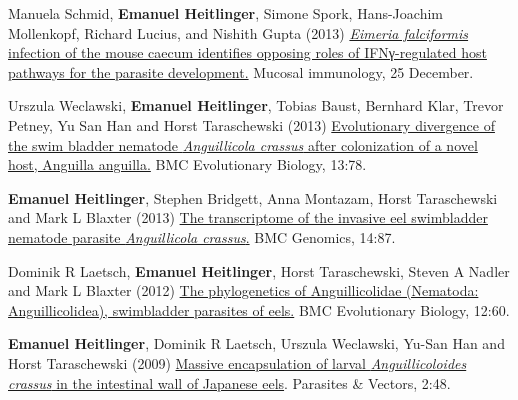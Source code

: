 \documentclass[10pt,a4paper]{article}
\renewenvironment{itemize}{
  \begin{list}{}{
    \setlength{\leftmargin}{2.5em}
    \setlength{\itemsep}{0.25em}
    \setlength{\parskip}{0pt}
    \setlength{\parsep}{0.25em}
  }
}{
  \end{list}
}
\begin{document}
\begin{itemize}



\item Manuela Schmid, \textbf{Emanuel Heitlinger}, Simone Spork, Hans-Joachim
  Mollenkopf, Richard Lucius, and Nishith Gupta (2013)
  \href{http://www.nature.com/mi/journal/vaop/ncurrent/full/mi2013115a.html}
  {\textit{Eimeria falciformis} infection of the mouse caecum identifies
    opposing roles of IFNγ-regulated host pathways for the parasite
    development.} Mucosal immunology, 25 December.

\item Urszula Weclawski, \textbf{Emanuel Heitlinger}, Tobias Baust,
  Bernhard Klar, Trevor Petney, Yu San Han and Horst Taraschewski
  (2013) 
  \href{http://www.biomedcentral.com/1471-2148/13/78}{
    Evolutionary divergence of the swim bladder nematode
    \textit{Anguillicola crassus} after colonization of a novel host,
    Anguilla anguilla.} BMC Evolutionary Biology,
  13:78.

\item \textbf{Emanuel Heitlinger}, Stephen Bridgett, Anna Montazam,
  Horst Taraschewski and Mark L Blaxter (2013)
  \href{http://www.biomedcentral.com/1471-2164/14/87}{The
    transcriptome of the invasive eel swimbladder nematode parasite
    \textit{Anguillicola crassus}.} BMC Genomics, 
  14:87.

\item Dominik R Laetsch, \textbf{Emanuel Heitlinger}, Horst
  Taraschewski, Steven A Nadler and Mark L Blaxter (2012)
  \href{http://www.biomedcentral.com/1471-2148/12/60} {The
    phylogenetics of Anguillicolidae (Nematoda: Anguillicolidea),
    swimbladder parasites of eels.} BMC Evolutionary Biology,
  12:60.

\item \textbf{Emanuel Heitlinger}, Dominik R Laetsch, Urszula
  Weclawski, Yu-San Han and Horst Taraschewski (2009)
  \href{http://www.parasitesandvectors.com/content/2/1/48}{Massive
    encapsulation of larval \textit{Anguillicoloides crassus} in the
    intestinal wall of Japanese eels}. Parasites \& Vectors,
  2:48.
\end{itemize}
\end{document}
